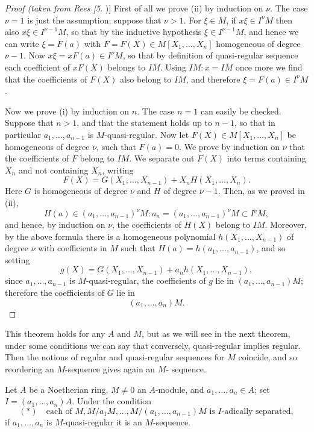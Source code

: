 \begin{proof}[Proof (taken from Rees [5])]
First of all we prove (ii) by induction on $\nu$.
The case $\nu = 1$ is just the assumption; suppose that $\nu > 1$. For $\xi \in M$, if
$x\xi \in I^\nu M$ then also $x\xi \in I^{\nu-1}M$, so that by the inductive hypothesis
$\xi \in I^{\nu-1}M$, and hence we can write $\xi = F(a)$ with $F = F(X) \in M[X_1, \ldots,
X_n]$ homogeneous of degree $\nu - 1$. Now $x\xi = xF(a) \in I^\nu M$, so that by
definition of quasi-regular sequence each coefficient of $xF(X)$ belongs to
$IM$. Using $IM:x = IM$ once more we find that the coefficients of $F(X)$
also belong to $IM$, and therefore $\xi = F(a) \in I^\nu M$.

Now we prove (i) by induction on $n$. The case $n = 1$ can easily be
checked. Suppose that $n > 1$, and that the statement holds up to $n - 1$, so
that in particular $a_1, \ldots, a_{n-1}$ is $M$-quasi-regular. Now let $F(X) \in
M[X_1, \ldots, X_n]$ be homogeneous of degree $\nu$, such that $F(a) = 0$. We prove
by induction on $\nu$ that the coefficients of $F$ belong to $IM$. We separate
out $F(X)$ into terms containing $X_n$ and not containing $X_n$, writing
\[
  F(X) = G(X_1, \ldots, X_{n-1}) + X_nH(X_1, \ldots, X_n).
\]
Here $G$ is homogeneous of degree $\nu$ and $H$ of degree $\nu - 1$. Then, as we
proved in (ii),
\[
  H(a) \in (a_1, \ldots, a_{n-1})^\nu M:a_n = (a_1, \ldots, a_{n-1})^\nu M \subset I^\nu M,
\]
and hence, by induction on $\nu$, the coefficients of $H(X)$ belong to $IM$.
Moreover, by the above formula there is a homogeneous polynomial
$h(X_1, \ldots, X_{n-1})$ of degree $\nu$ with coefficients in $M$ such that $H(a) =
h(a_1, \ldots, a_{n-1})$, and so setting
\[
  g(X) = G(X_1, \ldots, X_{n-1}) + a_nh(X_1, \ldots, X_{n-1}),
\]
since $a_1, \ldots, a_{n-1}$ is $M$-quasi-regular, the coefficients of $g$ lie in
$(a_1, \ldots, a_{n-1})M$; therefore the coefficients of $G$ lie in
\[
  (a_1, \ldots, a_n)M.
\]
\end{proof}

This theorem holds for any $A$ and $M$, but as we will see in the next
theorem, under some conditions we can say that conversely, quasi-regular
implies regular. Then the notions of regular and quasi-regular sequences
for $M$ coincide, and so reordering an $M$-sequence gives again an $M$-
sequence.

\begin{theorem}\label{thm:16.3}
Let $A$ be a Noetherian ring, $M \neq 0$ an $A$-module, and
$a_1, \ldots, a_n \in A$; set $I = (a_1, \ldots, a_n)A$. Under the condition
\[
  (*) \quad \text{each of } M, M/a_1M, \ldots, M/(a_1, \ldots, a_{n-1})M \text{ is } I\text{-adically separated},
\]
if $a_1, \ldots, a_n$ is $M$-quasi-regular it is an $M$-sequence.
\end{theorem}

